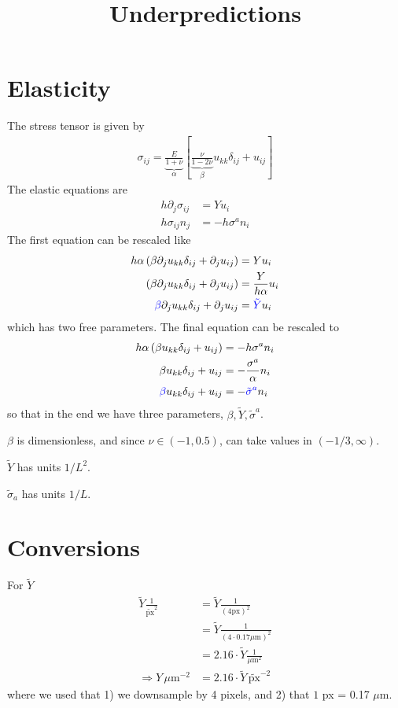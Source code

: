 \documentclass{article}
\title{Underpredictions}
\begin{document}
\section{Elasticity}
The stress tensor is given by
\begin{align*}
    \sigma_{ij} =\underbrace{\frac{E}{1+\nu}}_{\alpha}\left[\underbrace{\frac{\nu}{1-2\nu}}_{\beta}u_{kk}\delta_{ij} + u_{ij}\right]
\end{align*}
The elastic equations are
\begin{align*}
    h\partial_j\sigma_{ij} &= Yu_i 
    \\
    h\sigma_{ij}n_j &= -h\sigma^a n_i 
\end{align*}
The first equation can be rescaled like 
\begin{align*}
    h\alpha\left(\beta \partial_ju_{kk}\delta_{ij} + \partial_j u_{ij} \right) &= Yu_i 
    \\
    \left(\beta \partial_ju_{kk}\delta_{ij} + \partial_j u_{ij} \right) &= \frac{Y}{h\alpha}u_i 
    \\
    {\color{blue}\beta} \partial_ju_{kk}\delta_{ij} + \partial_j u_{ij} &= {\color{blue}\tilde{Y}}u_i 
\end{align*}
which has two free parameters.
The final equation can be rescaled to 
\begin{align*}
    h\alpha\left(\beta u_{kk}\delta_{ij} + u_{ij} \right) &= -h\sigma^a n_i
    \\
    \beta u_{kk}\delta_{ij} + u_{ij} &= -\frac{\sigma^a}{\alpha} n_i
    \\
    {\color{blue}\beta}  u_{kk}\delta_{ij} + u_{ij} &= -{\color{blue}\tilde{\sigma}^a}  n_i
\end{align*}
so that in the end we have three parameters, $\beta, \tilde{Y}, \tilde{\sigma}^a$.

$\beta$ is dimensionless, and since $\nu\in(-1, 0.5)$, can take values in $(-1/3, \infty)$. 

$\tilde Y$ has units $1/L^2$.

$\tilde \sigma_a$ has units $1/L$.

\section{Conversions}
For $\tilde Y$
\begin{align*}
    \tilde Y\frac{1}{\tilde{\text{px}}^2} &= \tilde Y\frac{1}{(4\text{px})^2} 
    \\
    &= \tilde Y\frac{1}{(4\cdot 0.17\mu\text{m})^2} 
    \\
    &= 2.16\cdot \tilde Y\frac{1}{\mu\text{m}^2} 
    \\
    \Rightarrow Y \,\mu\text{m}^{-2} &=  2.16\cdot\tilde{Y}\, \tilde{\text{px}}^{-2} 
\end{align*}
where we used that 1) we downsample by 4 pixels, and 2) that $1$ px = 0.17 $\mu$m.
\end{document}
